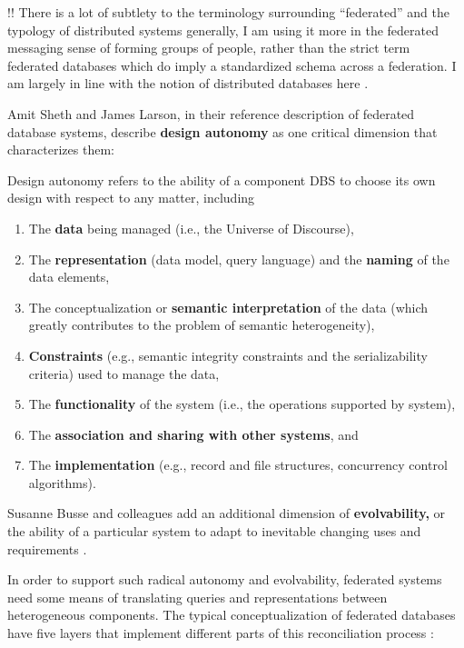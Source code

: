 \documentclass[10pt]{article}
\begin{document}
\begin{multicols}{2}
!! There is a lot of subtlety to the terminology surrounding
``federated'' and the typology of distributed systems generally, I am
using it more in the federated messaging sense of forming groups of
people, rather than the strict term federated databases which do imply a
standardized schema across a federation. I am largely in line with the
notion of distributed databases here \cite{hankeDefenseDecentralizedResearch2021} .

Amit Sheth and James Larson, in their reference description of federated
database systems, describe \textbf{design autonomy} as one critical
dimension that characterizes them:

\begin{leftbar}
Design autonomy refers to the ability of a component DBS to choose its
own design with respect to any matter, including

\begin{enumerate}
\def\labelenumi{(\alph{enumi})}
\item
  The \textbf{data} being managed (i.e., the Universe of Discourse),
\item
  The \textbf{representation} (data model, query language) and the
  \textbf{naming} of the data elements,
\item
  The conceptualization or \textbf{semantic interpretation} of the data
  (which greatly contributes to the problem of semantic heterogeneity),
\item
  \textbf{Constraints} (e.g., semantic integrity constraints and the
  serializability criteria) used to manage the data,
\item
  The \textbf{functionality} of the system (i.e., the operations
  supported by system),
\item
  The \textbf{association and sharing with other systems}, and
\item
  The \textbf{implementation} (e.g., record and file structures,
  concurrency control algorithms).
\end{enumerate}
\end{leftbar}

Susanne Busse and colleagues add an additional dimension of
\textbf{evolvability,} or the ability of a particular system to adapt to
inevitable changing uses and requirements \cite{busseFederatedInformationSystems1999} .

In order to support such radical autonomy and evolvability, federated
systems need some means of translating queries and representations
between heterogeneous components. The typical conceptualization of
federated databases have five layers that implement different parts of
this reconciliation process \cite{shethFederatedDatabaseSystems1990} :


\end{multicols}
\end{document}
